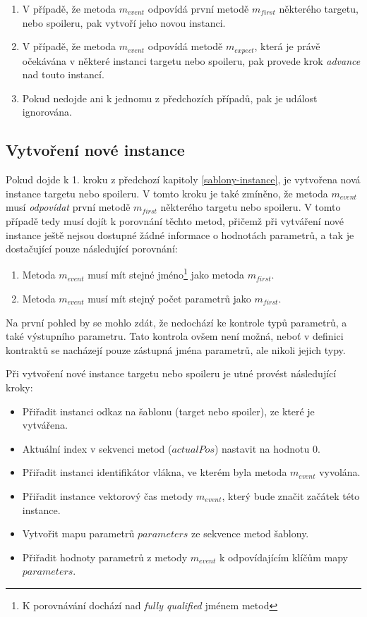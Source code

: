 \begin{enumerate}
\item{V případě, že metoda $m_{event}$ odpovídá první metodě $m_{first}$ některého targetu, nebo spoileru, pak vytvoří jeho novou instanci.}
\item{V případě, že metoda $m_{event}$ odpovídá metodě $m_{expect}$, která je právě očekávána v některé instanci targetu nebo spoileru, pak provede krok \textit{advance} nad touto instancí.}
\item{Pokud nedojde ani k jednomu z předchozích případů, pak je událost ignorována.}
\end{enumerate}

\subsection{Vytvoření nové instance}\label{new-instance}

Pokud dojde k 1. kroku z předchozí kapitoly \ref{sablony-instance}, je vytvořena nová instance targetu nebo spoileru. V tomto kroku je také zmíněno, že metoda $m_{event}$ musí \textit{odpovídat} první metodě $m_{first}$ některého targetu nebo spoileru. V tomto případě tedy musí dojít k porovnání těchto metod, přičemž při vytváření nové instance ještě nejsou dostupné žádné informace o hodnotách parametrů, a tak je dostačující pouze následující porovnání:

\begin{enumerate}
\item{Metoda $m_{event}$ musí mít stejné jméno\footnote{K porovnávání dochází nad \textit{fully qualified} jménem metod} jako metoda $m_{first}$.}
\item{Metoda $m_{event}$ musí mít stejný počet parametrů jako $m_{first}$.}
\end{enumerate}

Na první pohled by se mohlo zdát, že nedochází ke kontrole typů parametrů, a také výstupního parametru. Tato kontrola ovšem není možná, neboť v definici kontraktů se nacházejí pouze zástupná jména parametrů, ale nikoli jejich typy.

Při vytvoření nové instance targetu nebo spoileru je utné provést následující kroky:

\begin{itemize}
\item{Přiřadit instanci odkaz na šablonu (target nebo spoiler), ze které je vytvářena.}
\item{Aktuální index v sekvenci metod ($actualPos$) nastavit na hodnotu 0.}
\item{Přiřadit instanci identifikátor vlákna, ve kterém byla metoda $m_{event}$ vyvolána.}
\item{Přiřadit instance vektorový čas metody $m_{event}$, který bude značit začátek této instance.}
\item{Vytvořit mapu parametrů $parameters$ ze sekvence metod šablony.}
\item{Přiřadit hodnoty parametrů z metody $m_{event}$ k odpovídajícím klíčům mapy $parameters$.}
\end{itemize}


